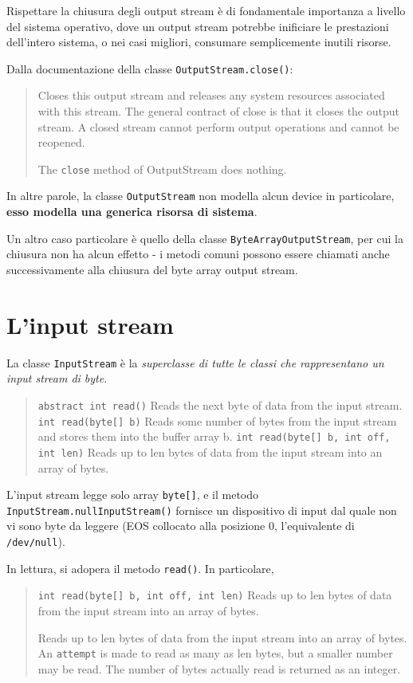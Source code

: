 \documentclass[\fontsizeclass,twocolumn]{\classname}
\theoremstyle{definition}
\theoremstyle{definition}
\begin{document}
Rispettare la chiusura degli output stream è di fondamentale importanza a
livello del sistema operativo, dove un output stream potrebbe inificiare le
prestazioni dell'intero sistema, o nei casi migliori, consumare semplicemente
inutili risorse.

Dalla documentazione della classe \texttt{OutputStream.close()}:
\begin{quote}
    \footnotesize{

    Closes this output stream and releases any system resources associated with
    this stream. The general contract of close is that it closes the output
    stream. A closed stream cannot perform output operations and cannot be
    reopened.

    The \texttt{close} method of OutputStream does nothing.
}
\end{quote}

In altre parole, la classe \texttt{Output\-Stream} non modella alcun device in
particolare, \textbf{esso modella una generica risorsa di sistema}.

Un altro caso particolare è quello della classe \texttt{ByteArrayOutputStream},
per cui la chiusura non ha alcun effetto \-- i metodi comuni possono essere
chiamati anche successivamente alla chiusura del byte array output stream.

\section{L'input stream}

La classe \texttt{Input\-Stream} è la \emph{superclasse di tutte le classi che
rappresentano un input stream di byte}.


\begin{quote}
    \footnotesize{\texttt{abstract int 	read()} 	Reads the next byte of data from the input stream.
        \texttt{int 	read(byte[] b)} 	Reads some number of bytes from the input stream and stores them into the buffer array b.
    \texttt{int 	read(byte[] b, int off, int len)} 	Reads up to len bytes of data from the input stream into an array of bytes.}
\end{quote}

L'input stream legge solo array \texttt{byte[]}, e il metodo
\texttt{InputStream.nullInputStream()} fornisce un dispositivo di input dal
quale non vi sono byte da leggere (EOS collocato alla posizione 0,
l'equivalente di \texttt{/dev/null}).

In lettura, si adopera il metodo \texttt{read()}. In particolare,
\begin{quote}
    \footnotesize{\texttt{int 	read(byte[] b, int off, int len)} 	Reads up to
    len bytes of data from the input stream into an array of bytes.

Reads up to len bytes of data from the input stream into an array of bytes. An
\texttt{attempt} is made to read as many as len bytes, but a smaller number may be read.
The number of bytes actually read is returned as an integer.}
\end{quote}
\end{document}
